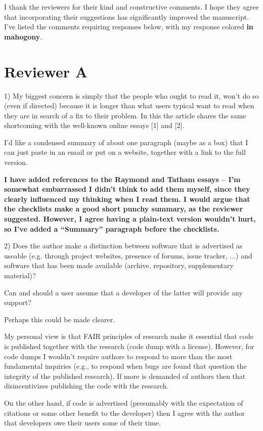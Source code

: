 \documentclass[11pt]{article}
\newcommand{\response}[1]{\textcolor{Mahogany}{\textbf{#1}}}
\begin{document}
I thank the reviewers for their kind and constructive comments. I hope they agree that incorporating their suggestions has significantly improved the manuscript. I've listed the comments requiring responses below, with my response colored \response{in mahogony}.

\section{Reviewer A}

1) My biggest concern is simply that the people who ought to read it,
won't do so (even if directed) because it is longer than what users
typical want to read when they are in search of a fix to their
problem. In this the article shares the same shortcoming with the
well-known online essays [1] and [2].

I'd like a condensed summary of about one paragraph (maybe as a
box) that I can just paste in an email or put on a website,
together with a link to the full version.

\response{I have added references to the Raymond and Tatham essays -- I'm
somewhat embarrassed I didn't think to add them myself, since they clearly
influenced my thinking when I read them. I would argue that the checklists make
a good short punchy summary, as the reviewer suggested. However, I agree having
a plain-text version wouldn't hurt, so I've added a ``Summary'' paragraph before
the checklists.}

2) Does the author make a distinction between software that is
advertised as useable (e.g. through project websites, presence of
forums, issue tracker, ...) and software that has been made
available (archive, repository, supplementary material)?

Can and should a user assume that a developer of the latter will
provide any support?

Perhaps this could be made clearer.

My personal view is that FAIR principles of research make it
essential that code is published together with the research (code
dump with a license). However, for code dumps I wouldn't require
authors to respond to more than the most fundamental inquiries
(e.g., to respond when bugs are found that question the integrity
of the published research). If more is demanded of authors then
that disincentivizes publishing the code with the research.

On the other hand, if code is advertised (presumably with the
expectation of citations or some other benefit to the developer)
then I agree with the author that developers owe their users some
of their time.
\end{document}
